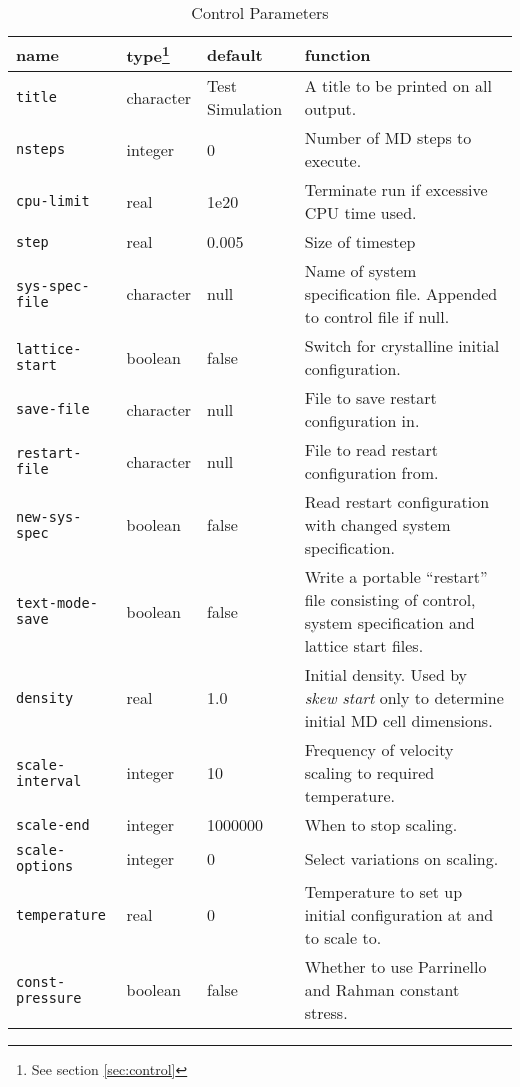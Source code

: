 \begin{table}
\begin{minipage}{\textwidth}
\caption{Control Parameters}
\label{tab:parameters}
\begin{tabular}{|l|l|l|p{2.7in}|}
\hline
{\bf name} & {\bf type}\footnote{See section \ref{sec:control}} &
{\bf default} & {\bf function} \\ \hline \hline
\verb'title' &	    		character  & {\small Test Simulation} &
A title to be printed on all output. \\
\verb'nsteps' &	    		integer & 			0 &
Number of MD steps to execute. \\
\verb'cpu-limit' &		real &			1e20 &
Terminate run if excessive CPU time used. \\
\verb'step' &	    		real &			0.005 &
Size of timestep \\ \hline
\verb'sys-spec-file' &   	character  &	null &
Name of system specification file.  Appended to control file if null. \\
\verb'lattice-start' &		boolean & 		false  &
Switch for crystalline initial configuration. \\
\verb'save-file' &	   	character  &	null &
File to save restart configuration in. \\
\verb'restart-file' &    	character  &	null &
File to read restart configuration from. \\
\verb'new-sys-spec' &    	boolean & 		false  &
Read restart configuration with changed system specification. \\
\verb'text-mode-save' &  	boolean & 		false &
Write a portable ``restart'' file consisting of control, system
specification and lattice start files. \\ \hline
\verb'density' &	    	real &			1.0 &
Initial density.  Used by {\em skew start} only to determine initial
MD cell dimensions. \\ \hline
\verb'scale-interval' &    	integer & 		10 &
Frequency of velocity scaling to required temperature. \\
\verb'scale-end' &	   	integer & 			1000000 &
When to stop scaling. \\
\verb'scale-options' &           integer & 		0  &
Select variations on scaling. \\
\verb'temperature' &    	real &			0 &
Temperature to set up initial configuration at and to scale to. \\ \hline
\verb'const-pressure' &  	boolean & 		false  &
Whether to use Parrinello and Rahman constant stress. \\

\end{tabular}
\end{minipage}
\end{table}
